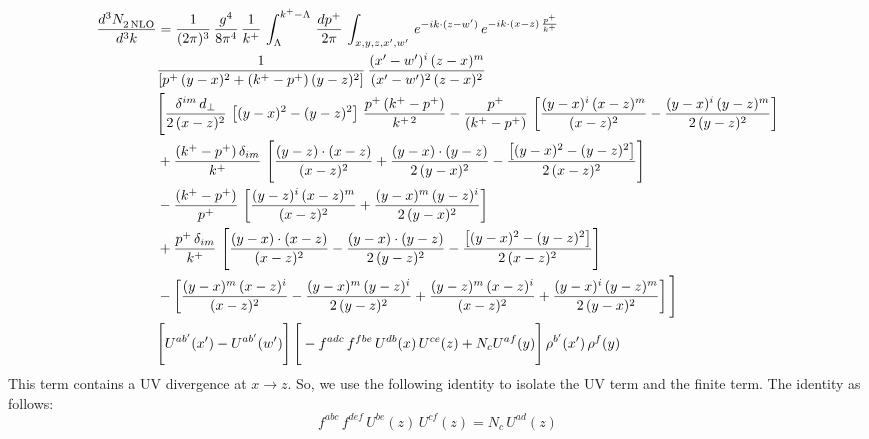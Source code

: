 \documentclass[9pt]{article}
\numberwithin{equation}{section}
\begin{document}
\begin{align}
    \frac{d^{3}N_{2\,\rm NLO}^{\rm}}{d^{3}k}  & =  \frac{1}{(2\pi)^{3}}\, \frac{g^{4}}{8\pi^{4}}\,\frac{1}{k^{+}}\,\int_{\Lambda}^{k^{+}-\Lambda}\, \frac{dp^{+}}{2\pi} \, \int_{x,y,z,x',w'}\,e^{-ik\cdot(z-w')}\,e^{-ik\cdot (x-z)\,\frac{p^{+}}{k^{+}}}\,\notag \\ & \frac{1}{\left[p^{+}\,(y-x)^{2}+(k^{+}-p^{+})\,(y-z)^{2}\right]}\, \frac{(x'-w')^{i}\,(z-x)^{m}}{(x'-w')^{2}\,(z-x)^{2}} \notag \\ & \Bigg[\frac{\delta^{im}\,d_{\perp}}{2\,(x-z)^{2}}\,\left[(y-x)^{2}-(y-z)^{2}\right]\,\frac{p^{+}\,(k^{+}-p^{+})}{k^{+\,2}}-\frac{p^{+}}{(k^{+}-p^{+})}\,\left[\frac{(y-x)^{i}\,(x-z)^{m}}{(x-z)^{2}}-\frac{(y-x)^{i}\,(y-z)^{m}}{2\,(y-z)^{2}}\right]\notag \\ & +\frac{(k^{+}-p^{+})\,\delta_{im}}{k^{+}}\,\left[\frac{(y-z)\cdot (x-z)}{(x-z)^{2}}+\frac{(y-x)\cdot (y-z)}{2\,(y-x)^{2}}-\frac{\left[(y-x)^{2}-(y-z)^{2}\right]}{2\,(x-z)^{2}}\right]\notag \\ & -\frac{(k^{+}-p^{+})}{p^{+}}\,\left[\frac{(y-z)^{i}\,(x-z)^{m}}{(x-z)^{2}}+\frac{(y-x)^{m}\,(y-z)^{i}}{2\,(y-x)^{2}}\right]\notag \\ & +\frac{p^{+}\,\delta_{im}}{k^{+}}\,\left[\frac{(y-x)\cdot (x-z)}{(x-z)^{2}}-\frac{(y-x)\cdot (y-z)}{2\,(y-z)^{2}}-\frac{\left[(y-x)^{2}-(y-z)^{2}\right]}{2\,(x-z)^{2}}\right]\notag \\ &-\left[\frac{(y-x)^{m}\,(x-z)^{i}}{(x-z)^{2}}-\frac{(y-x)^{m}\,(y-z)^{i}}{2\,(y-z)^{2}}+\frac{(y-z)^{m}\,(x-z)^{i}}{(x-z)^{2}}+\frac{(y-x)^{i}\,(y-z)^{m}}{2\,(y-x)^{2}}\right]\Bigg] \notag \\ & \Bigg[U^{ab'}(x')-U^{ab'}(w')\Bigg]\,\Bigg[-f^{adc}\,f^{fbe}\,U^{db}(x)\,U^{ce}(z)+N_{c}U^{af}(y)\Bigg]\,\rho^{b'}(x')\,\rho^{f}(y)
\end{align}
This term contains a UV divergence at $x\rightarrow z$.  So, we use the following identity to isolate the UV term and the finite term. The identity as follows:
$$f^{abc}\,f^{def}\,U^{be}(z)\,U^{cf}(z) = N_{c}\,U^{ad}(z)$$
\end{document}

